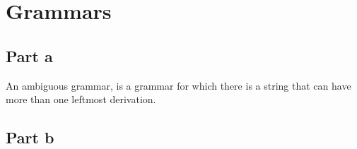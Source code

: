 \documentclass[paper=a4, fontsize=11pt]{scrartcl} %
\numberwithin{equation}{section} %
\numberwithin{figure}{section} %
\numberwithin{table}{section} %
\begin{document}
\section{Grammars}

\subsection{Part a}

An ambiguous grammar, is a grammar for which there is a string that can have more than one leftmost derivation.

\subsection{Part b}



\end{document}
